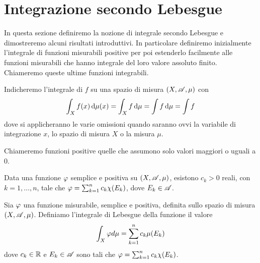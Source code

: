 
\section{Integrazione secondo Lebesgue}
In questa sezione definiremo la nozione di integrale secondo Lebesgue e dimostreremo alcuni risultati introduttivi. In particolare definiremo inizialmente l'integrale di funzioni misurabili positive per poi estenderlo facilmente alle funzioni misurabili che hanno integrale del loro valore assoluto finito. Chiameremo queste ultime funzioni integrabili.

\begin{remark}
	Indicheremo l'integrale di $f$ su una spazio di misura $(X,\mathscr A,\mu)$ con 
	\begin{equation*}
		\int_X f(x) \,\mathrm d \mu(x)=\int_X f \,\mathrm d \mu=\int f \,\mathrm d \mu=\int f
	\end{equation*}
	dove si applicheranno le varie omissioni quando saranno ovvi la variabile di integrazione $x$, lo spazio di misura $X$ o la misura $\mu$.
\end{remark}

\begin{remark}
	Chiameremo funzioni positive quelle che assumono solo valori maggiori o uguali a 0.
\end{remark}



\begin{lemma}
	Data una funzione $\varphi$ semplice e positiva su $(X,\mathscr A,\mu)$, esistono $c_k>0$ reali, con $k=1,\dots, n$, tale che $\varphi=\sum_{k=1}^nc_k\chi(E_k)$, dove $E_k\in \mathscr A$.
\end{lemma}


\begin{definition}\label{DefIntSemp}
	Sia $\varphi$ una funzione misurabile, semplice e positiva, definita sullo spazio di misura $(X,\mathscr A,\mu)$. Definiamo l'integrale di Lebesgue della funzione il valore
	\begin{equation*}
		\int_X \varphi d \mu = \sum_{k=1}^n c_k\mu(E_k)
	\end{equation*}
	dove $c_k\in \mathbb R$ e $E_k \in \mathscr A$ sono tali che $\varphi=\sum_{k=1}^nc_k\chi(E_k)$.
\end{definition}

